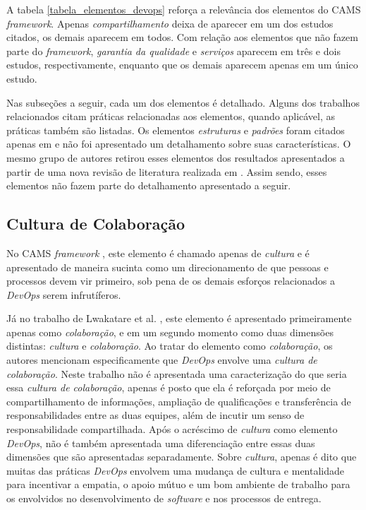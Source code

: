 A tabela \ref{tabela_elementos_devops} reforça a relevância dos elementos do
\acrshort{CAMS} \textit{framework}. Apenas \emph{compartilhamento} deixa de
aparecer em um dos estudos citados, os demais aparecem em todos. Com relação
aos elementos que não fazem parte do \textit{framework}, \emph{garantia
da qualidade} e \emph{serviços} aparecem em três e dois estudos, respectivamente,
enquanto que os demais aparecem apenas em um único estudo.

Nas subseções a seguir, cada um dos elementos é detalhado. Alguns dos trabalhos
relacionados citam práticas relacionadas aos elementos, quando aplicável, as
práticas também são listadas. Os elementos \emph{estruturas} e \emph{padrões}
foram citados apenas em \cite{cooperation_dev_ops_esem_2014} e não foi
apresentado um detalhamento sobre suas características. O mesmo grupo de
autores retirou esses elementos dos resultados apresentados a partir de uma
nova revisão de literatura realizada em \cite{qualitative_devops_journalsw_17}.
Assim sendo, esses elementos não fazem parte do detalhamento apresentado a
seguir.

\subsection{Cultura de Colaboração}

No \acrshort{CAMS} \textit{framework} \cite{what_devops_means_2010}, este
elemento é chamado apenas de \emph{cultura} e é apresentado de maneira sucinta
como um direcionamento de que pessoas e processos devem vir primeiro, sob pena
de os demais esforços relacionados a \textit{DevOps} serem infrutíferos.

Já no trabalho de Lwakatare et al. \cite{dimensions_of_devops,extending_dimensions},
este elemento é apresentado primeiramente apenas como \emph{colaboração}, e em
um segundo momento como duas dimensões distintas: \emph{cultura} e
\emph{colaboração}. Ao tratar do elemento como \emph{colaboração}, os autores
mencionam especificamente que \textit{DevOps} envolve uma \emph{cultura de colaboração}.
Neste trabalho não é apresentada uma caracterização do que seria essa \emph{cultura
de colaboração}, apenas é posto que ela é reforçada por meio de
compartilhamento de informações, ampliação de qualificações e transferência de
responsabilidades entre as duas equipes, além de incutir um senso de
responsabilidade compartilhada. Após o acréscimo de \emph{cultura} como elemento
\textit{DevOps}, não é também apresentada uma diferenciação entre essas duas
dimensões que são apresentadas separadamente. Sobre \emph{cultura}, apenas é
dito que muitas das práticas \textit{DevOps} envolvem uma mudança de cultura e
mentalidade para incentivar a empatia, o apoio mútuo e um bom ambiente de
trabalho para os envolvidos no desenvolvimento de \textit{software} e
nos processos de entrega.

